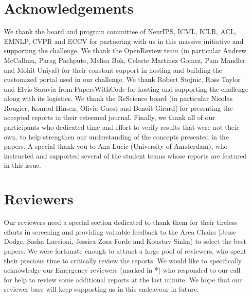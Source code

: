 \section{Acknowledgements}

We thank the board and program committee of NeurIPS, ICML, ICLR, ACL, EMNLP, CVPR and ECCV for partnering with us in this massive initiative and supporting the challenge. We thank the OpenReview team (in particular Andrew McCallum, Parag Pachpute, Melisa Bok, Celeste Martinez Gomez, Pam Mandler and Mohit Uniyal) for their constant support in hosting and building the customized portal used in our challenge. We thank Robert Stojnic, Ross Taylor and Elvis Saravia from PapersWithCode for hosting and supporting the challenge along with its logistics. We thank the ReScience board (in particular Nicolas Rougier, Konrad Hinsen, Olivia Guest and Benoît Girard) for presenting the accepted reports in their esteemed journal. Finally, we thank all of our participants who dedicated time and effort to verify results that were not their own, to help strengthen our understanding of the concepts presented in the papers.  A special thank you to Ana Lucic (University of Amsterdam), who instructed and supported several of the student teams whose reports are featured in this issue.

\section{Reviewers}

Our reviewers need a special section dedicated to thank them for their tireless efforts in screening and providing valuable feedback to the Area Chairs (Jesse Dodge, Sasha Luccioni, Jessica Zosa Forde and Koustuv Sinha) to select the best papers. We were fortunate enough to attract a large pool of reviewers, who spent their precious time to critically review the reports. We would like to specifically acknowledge  our Emergency reviewers (marked in *) who responded to our call for help to review some additional reports at the last minute. We hope that our reviewer base will keep supporting us in this endeavour in future.

